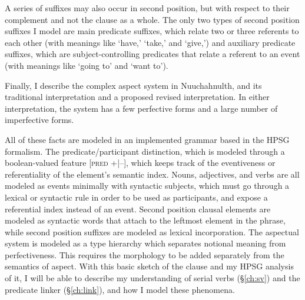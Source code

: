 A series of suffixes may also occur in second position, but with respect to their complement and not the clause as a whole. The only two types of second position suffixes I model are main predicate suffixes, which relate two or three referents to each other (with meanings like `have,' `take,' and `give,') and auxiliary predicate suffixes, which are subject-controlling predicates that relate a referent to an event (with meanings like `going to' and `want to').

Finally, I describe the complex aspect system in Nuuchahnulth, and its traditional interpretation and a proposed revised interpretation. In either interpretation, the system has a few perfective forms and a large number of imperfective forms.

All of these facts are modeled in an implemented grammar based in the HPSG formalism. The predicate/participant distinction, which is modeled through a boolean-valued feature [\textsc{pred} +|--], which keeps track of the eventiveness or referentiality of the element's semantic index. Nouns, adjectives, and verbs are all modeled as events minimally with syntactic subjects, which must go through a lexical or syntactic rule in order to be used as participants, and expose a referential index instead of an event. Second position clausal elements are modeled as syntactic words that attach to the leftmost element in the phrase, while second position suffixes are modeled as lexical incorporation. The aspectual system is modeled as a type hierarchy which separates notional meaning from perfectiveness. This requires the morphology to be added separately from the semantics of aspect. With this basic sketch of the clause and my HPSG analysis of it, I will be able to describe my understanding of serial verbs (\S\ref{ch:sv}) and the predicate linker (\S\ref{ch:link}), and how I model these phenomena.
\